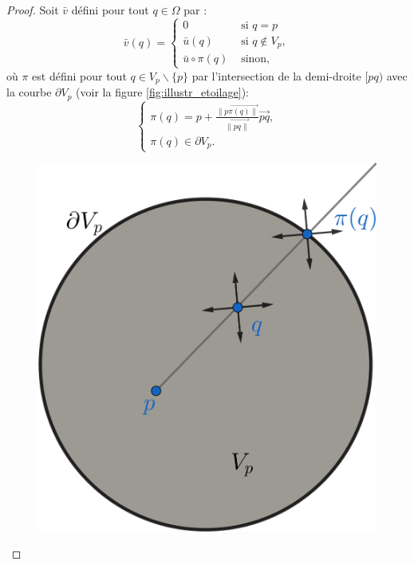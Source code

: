 \begin{proof}
Soit $\bar{v}$ défini pour tout $q\in\Omega$ par :
\begin{equation}
\label{eqn:equa_etoilage}
\bar{v}(q)=
\left\{
\begin{array}{ll}
0&\mbox{ si }q=p\\[0.25cm]
\bar{u}(q)&\mbox{ si } q\notin V_p,\\[0.25cm]
\bar{u}\circ\pi(q)&\mbox{ sinon},
\end{array}
\right.
\end{equation}
où $\pi$ est défini pour tout $q\in V_p\backslash\{p\}$ par l'intersection de la demi-droite $[pq)$ avec la courbe $\partial V_p$ (voir la figure \ref{fig:illustr_etoilage}):
\begin{equation*}
\left\{
\begin{array}{ll}
\pi(q)=p+\displaystyle\frac{\overrightarrow{\|p\pi(q)\|}}{\overrightarrow{\|pq\|}}\overrightarrow{pq},\\[0.5cm]
\pi(q)\in\partial V_p.
\end{array}
\right.
\end{equation*}
\begin{figure}[!h]
\centering
\includegraphics[scale=0.4]{images/illustr_etoilage.pdf}

\end{figure}
\end{proof}
